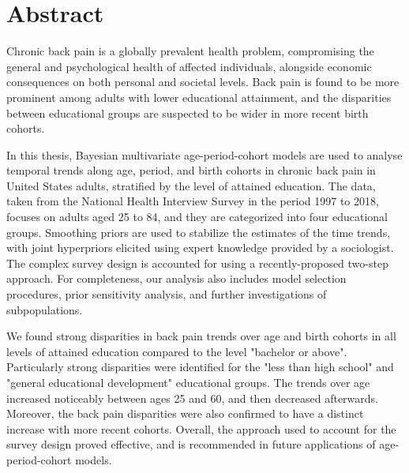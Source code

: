 \section*{Abstract}
Chronic back pain is a globally prevalent health problem, compromising the general and psychological health of affected individuals, alongside economic consequences on both personal and societal levels. Back pain is found to be more prominent among adults with lower educational attainment, and the disparities between educational groups are suspected to be wider in more recent birth cohorts.

In this thesis, Bayesian multivariate age-period-cohort models are used to analyse temporal trends along age, period, and birth cohorts in chronic back pain in United States adults, stratified by the level of attained education. The data, taken from the National Health Interview Survey in the period 1997 to 2018, focuses on adults aged 25 to 84, and they are categorized into four educational groups. Smoothing priors are used to stabilize the estimates of the time trends, with joint hyperpriors elicited using expert knowledge provided by a sociologist. The complex survey design is accounted for using a recently-proposed two-step approach. For completeness, our analysis also includes model selection procedures, prior sensitivity analysis, and further investigations of subpopulations.

We found strong disparities in back pain trends over age and birth cohorts in all levels of attained education compared to the level "bachelor or above". Particularly strong disparities were identified for the "less than high school" and "general educational development" educational groups. The trends over age increased noticeably between ages 25 and 60, and then decreased afterwards. Moreover, the back pain disparities were also confirmed to have a distinct increase with more recent cohorts. Overall, the approach used to account for the survey design proved effective, and is recommended in future applications of age-period-cohort models.


